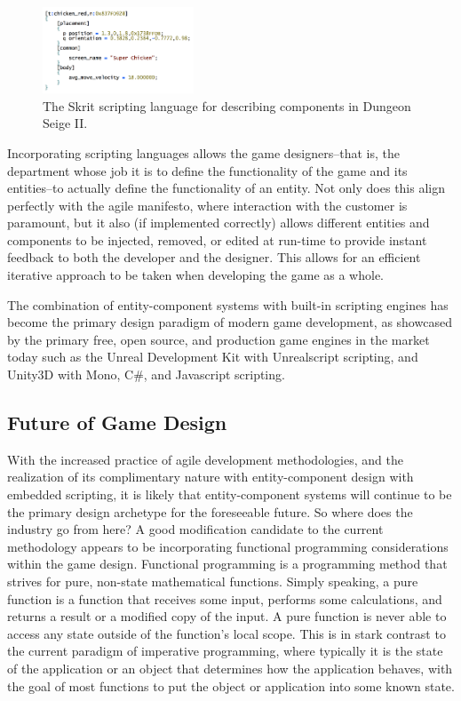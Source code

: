 \begin{figure}[h!]
  \centering \includegraphics[width=0.4\textwidth]{Images/skrit.png}
	\caption{The Skrit scripting language for describing components in Dungeon Seige II\cite{bilas2002data}.}
\end{figure}

Incorporating scripting languages allows the game designers--that is, the department whose job it is to define the functionality of the game and its entities--to actually define the functionality of an entity. Not only does this align perfectly with the agile manifesto, where interaction with the customer is paramount, but it also (if implemented correctly) allows different entities and components to be injected, removed, or edited at run-time to provide instant feedback to both the developer and the designer. This allows for an efficient iterative approach to be taken when developing the game as a whole.

The combination of entity-component systems with built-in scripting engines has become the primary design paradigm of modern game development, as showcased by the primary free, open source, and production game engines in the market today such as the Unreal Development Kit with Unrealscript scripting, and Unity3D with Mono, C\#, and Javascript scripting.

\subsection{Future of Game Design}

With the increased practice of agile development methodologies, and the realization of its complimentary nature with entity-component design with embedded scripting, it is likely that entity-component systems will continue to be the primary design archetype for the foreseeable future. So where does the industry go from here? A good modification candidate to the current methodology appears to be incorporating functional programming considerations within the game design. Functional programming is a programming method that strives for pure, non-state mathematical functions. Simply speaking, a pure function is a function that receives some input, performs some calculations, and returns a result or a modified copy of the input. A pure function is never able to access any state outside of the function's local scope. This is in stark contrast to the current paradigm of imperative programming, where typically it is the state of the application or an object that determines how the application behaves, with the goal of most functions to put the object or application into some known state.

